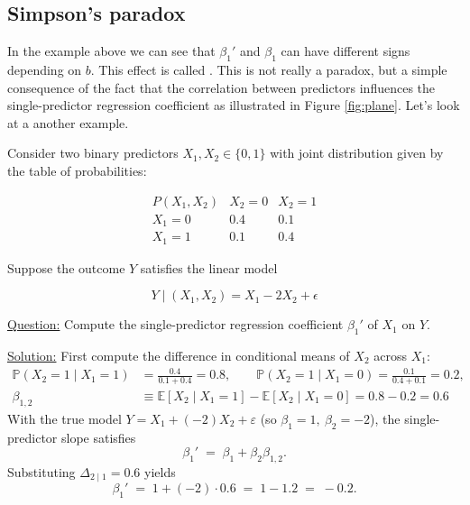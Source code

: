 \subsection{Simpson's paradox}
In the example above we can see that $\beta_1'$ and $\beta_1$ can have different signs depending on $b$. This effect is called . This is not really a paradox, but a simple consequence of the fact that the correlation between predictors influences the single-predictor regression coefficient as illustrated in Figure \ref{fig:plane}. Let's look at a another example. 

\begin{example}
Consider two binary predictors \(X_1, X_2 \in \{0,1\}\) with joint distribution given by the table of probabilities:

\[
\begin{array}{c|cc}
P(X_1, X_2) & X_2=0 & X_2=1 \\ \hline
X_1=0 & 0.4 & 0.1 \\
X_1=1 & 0.1 & 0.4
\end{array}
\]

Suppose the outcome \(Y\) satisfies the linear model

\[
Y \mid (X_1, X_2) = X_1 -2 X_2 + \epsilon 
\]


\noindent
\underline{Question:} Compute the single-predictor regression coefficient $\beta_1'$ of $X_1$ on $Y$. 


\noindent
\underline{Solution:}
First compute the difference in conditional means of \(X_2\) across \(X_1\):
\begin{align*}
\mathbb P(X_2=1\mid X_1=1) &= \frac{0.4}{0.1+0.4}=0.8,\qquad
\mathbb P(X_2=1\mid X_1=0) = \frac{0.1}{0.4+0.1}=0.2, \\
\beta_{1,2} &\equiv \mathbb E[X_2\mid X_1=1]-\mathbb E[X_2\mid X_1=0] = 0.8-0.2=0.6
\end{align*}
With the true model \(Y=X_1+(-2)X_2+\varepsilon\) (so \(\beta_1=1,\ \beta_2=-2\)), the single-predictor slope satisfies
\begin{equation*}
\beta_1' \;=\; \beta_1 + \beta_2\beta_{1,2}. 
\end{equation*}
Substituting \(\Delta_{2\mid 1}=0.6\) yields
\begin{equation*}
\beta_1' \;=\; 1 + (-2)\cdot 0.6 \;=\; 1-1.2 \;=\; -0.2. 
\end{equation*}

\end{example}




